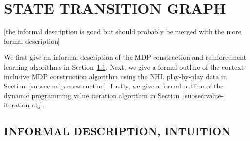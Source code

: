 \documentclass[]{article}
\begin{document}
\section{STATE TRANSITION GRAPH}

[the informal description is good but should probably be merged with the more formal description]

\label{sec:algorithms}


We first give an informal description of the MDP construction and reinforcement learning algorithms in Section~\ref{subsec:informal-description}. Next, we give a formal outline of the context-inclusive MDP construction algorithm using the NHL play-by-play data in Section~\ref{subsec:mdp-construction}. Lastly, we give a formal outline of the dynamic programming value iteration algorithm in Section~\ref{subsec:value-iteration-alg}.


\subsection{INFORMAL DESCRIPTION, INTUITION}
\label{subsec:informal-description}
\end{document}
